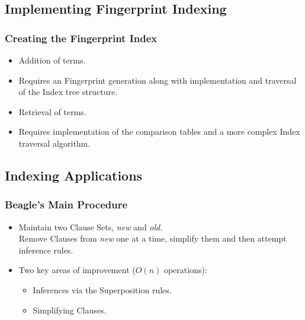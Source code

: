 \documentclass[10pt,xcolor={dvipsnames}]{beamer}
\begin{document}
\begin{NoHyper}
\subsection{Implementing Fingerprint Indexing}
\begin{frame}
  \frametitle{Creating the Fingerprint Index}
  \begin{itemize}
  \item<1-> Addition of terms.
  \item<2-> Requires an Fingerprint generation along with implementation and traversal of the Index tree structure.
  \item<3-> Retrieval of terms.
  \item<4-> Requires implementation of the comparison tables and a more complex
  Index traversal algorithm.
  \end{itemize}
\end{frame}

\subsection{Indexing Applications}
\begin{frame}
  \frametitle{Beagle's Main Procedure}
  \begin{itemize}
  \item<1-> 
Maintain two Clause Sets, \emph{new} and \emph{old}.\\
Remove Clauses from \emph{new} one at a time, simplify them and then
attempt inference rules.
  \item<2-> Two key areas of improvement ($O(n)$ operations):
  \begin{itemize}
  \item<2-> Inferences via the Superposition rules.
  \item<2-> Simplifying Clauses.
  \end{itemize}
  \end{itemize}
\end{frame}


\end{NoHyper}
\end{document}
